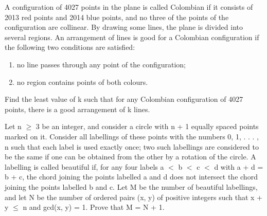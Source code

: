 \item A configuration of 4027 points in the plane is called Colombian if it consists of 2013 red points and 2014 blue points, and no three of the points of the configuration are collinear. By drawing some lines, the plane is divided into several regions. An arrangement of lines is good for a Colombian configuration if the following two conditions are satisfied:
\begin{enumerate}
\item no line passes through any point of the configuration;
\item no region contains points of both colours.
\end{enumerate}
Find the least value of k such that for any Colombian configuration of 4027 points, there is a good arrangement of k lines.

\item Let n $\geq$ 3 be an integer, and consider a circle with n + 1 equally spaced points marked on it. Consider all labellings of these points with the numbers 0, 1, . . . , n such that each label is used exactly once; two such labellings are considered to be the same if one can be obtained from the other by a rotation of the circle. A labelling is called beautiful if, for any four labels a $<$ b $<$ c $<$ d with a + d = b + c, the chord joining the points labelled a and d does not intersect the chord joining the points labelled b and c.
Let M be the number of beautiful labellings, and let N be the number of ordered pairs (x, y) of positive integers such that x + y $\leq$ n and gcd(x, y) = 1. Prove that M = N + 1.

